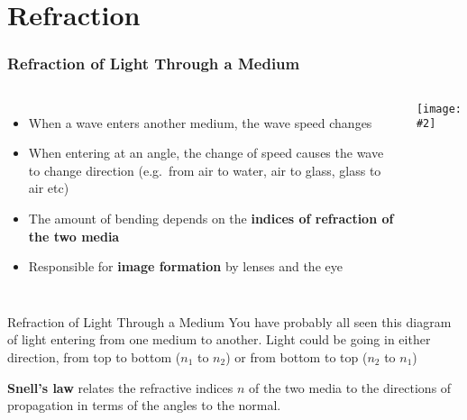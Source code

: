 \documentclass[compress,aspectratio=169]{beamer}
\newcommand{\pic}[2]{\texttt{[image: \#2]}}
\newcommand{\eq}[2]{\vspace{#1}{\LARGE\begin{displaymath}#2\end{displaymath}}}
\begin{document}
\section{Refraction}

\begin{frame}
  \frametitle{Refraction of Light Through a Medium}
  \begin{columns}
    \begin{itemize}
    \item When a wave enters another medium, the wave speed changes
    \item When entering at an angle, the change of speed causes the wave to
      change direction (e.g.\ from air to water, air to glass, glass to air etc)
    \item The amount of bending depends on the
      \textbf{indices of refraction of the two media}
    \item Responsible for \textbf{image formation} by lenses and the eye
    \end{itemize}
    \pic{1}{negative_refraction.jpg}
  \end{columns}
\end{frame}

\begin{frame}{Refraction of Light Through a Medium}
  You have probably all seen this diagram of light entering from one medium
  to another. Light could be going in either direction, from top to bottom
  ($n_1$ to $n_2$) or from bottom to top ($n_2$ to $n_1$)
  \begin{center}
    \vspace{-.2in}
  \end{center}
  \textbf{Snell's law} relates the refractive indices $n$ of the two media
  to the directions of propagation in terms of the angles to the normal. 

  \eq{-.2in}{
    \boxed{n_1\sin\theta_1=n_2\sin\theta_2}
  }
\end{frame}
\end{document}
